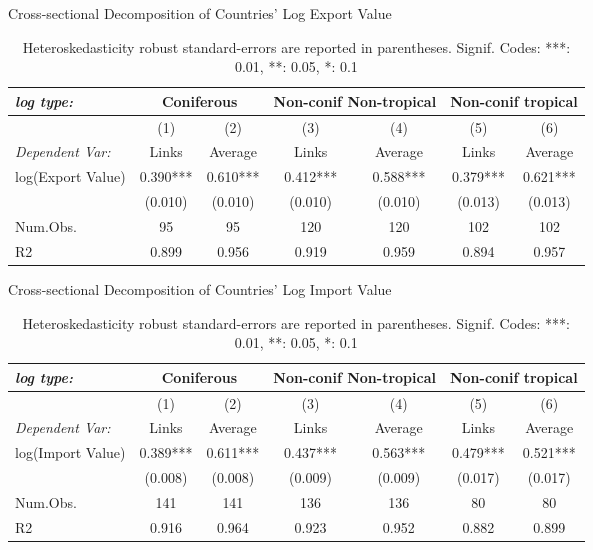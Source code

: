 \documentclass[a4paper,12pt]{article}
\begin{document}
\begin{table}[htbp]
    \centering
    \caption{Cross-sectional Decomposition of Countries' Log Export Value}
    \begin{tabular}[t]{lcccccc}
    \toprule
    \textit{log type:} &  \multicolumn{2}{c}{Coniferous}&  \multicolumn{2}{c}{Non-conif Non-tropical}&  \multicolumn{2}{c}{Non-conif tropical}\\
    \midrule
      & (1) & (2) & (3) & (4) & (5) & (6)\\
      \textit{Dependent Var:}& Links & Average & Links & Average & Links & Average \\
    \midrule
    log(Export Value)  & \num{0.390}*** & \num{0.610}*** & \num{0.412}*** & \num{0.588}*** & \num{0.379}*** & \num{0.621}***\\
    & (\num{0.010}) & (\num{0.010}) & (\num{0.010}) & (\num{0.010}) & (\num{0.013}) & (\num{0.013})\\
   \midrule
   Num.Obs. & \num{95} & \num{95} & \num{120} & \num{120} & \num{102} & \num{102}\\
   R2 & \num{0.899} & \num{0.956} & \num{0.919} & \num{0.959} & \num{0.894} & \num{0.957}\\
   \bottomrule
   \end{tabular}
   \caption*{\small{Heteroskedasticity robust standard-errors are reported in parentheses. Signif. Codes: ***: 0.01, **: 0.05, *: 0.1}}
   \label{tab:decomp_exp}
   \end{table}

\begin{table}[htbp]
    \centering
    \caption{Cross-sectional Decomposition of Countries' Log Import Value}
    \begin{tabular}[t]{lcccccc}
    \toprule
    \textit{log type:} &  \multicolumn{2}{c}{Coniferous}&  \multicolumn{2}{c}{Non-conif Non-tropical}&  \multicolumn{2}{c}{Non-conif tropical}\\
    \midrule
      & (1) & (2) & (3) & (4) & (5) & (6)\\
      \textit{Dependent Var:}& Links & Average & Links & Average & Links & Average \\
    \midrule
    log(Import Value) & \num{0.389}*** & \num{0.611}*** & \num{0.437}*** & \num{0.563}*** & \num{0.479}*** & \num{0.521}***\\
    & (\num{0.008}) & (\num{0.008}) & (\num{0.009}) & (\num{0.009}) & (\num{0.017}) & (\num{0.017})\\
   \midrule
   Num.Obs. & \num{141} & \num{141} & \num{136} & \num{136} & \num{80} & \num{80}\\
   R2 & \num{0.916} & \num{0.964} & \num{0.923} & \num{0.952} & \num{0.882} & \num{0.899}\\
   \bottomrule
   \end{tabular}
   \caption*{\small{Heteroskedasticity robust standard-errors are reported in parentheses. Signif. Codes: ***: 0.01, **: 0.05, *: 0.1}}
   \label{tab:decomp_imp}
   \end{table}
\end{document}
